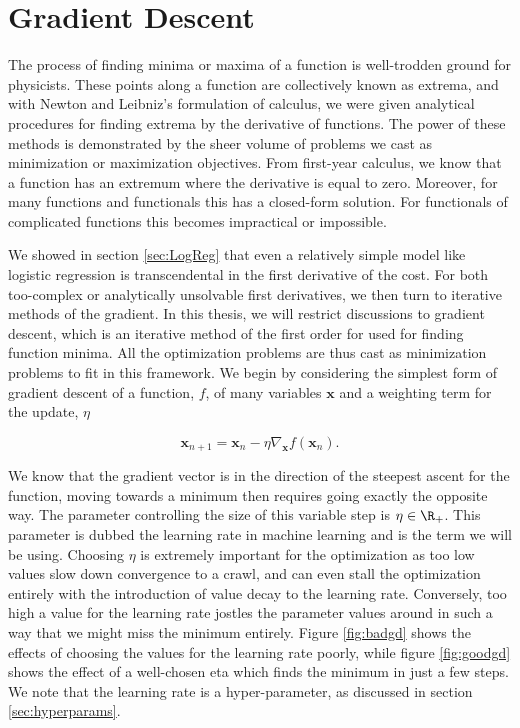 \section{Gradient Descent}\label{sec:gd}

The process of finding minima or maxima of a function is well-trodden ground for physicists. These points along a function are collectively known as extrema, and with Newton and Leibniz's formulation of calculus, we were given analytical procedures for finding extrema by the derivative of functions. The power of these methods is demonstrated by the sheer volume of problems we cast as minimization or maximization objectives. From first-year calculus, we know that a function has an extremum where the derivative is equal to zero. Moreover, for many functions and functionals this has a closed-form solution. For functionals of complicated functions this becomes impractical or impossible. 

We showed in section \ref{sec:LogReg} that even a relatively simple model like logistic regression is transcendental in the first derivative of the cost. For both too-complex or analytically unsolvable first derivatives, we then turn to iterative methods of the gradient. In this thesis, we will restrict discussions to gradient descent, which is an iterative method of the first order for used for finding function minima. All the optimization problems are thus cast as minimization problems to fit in this framework. We begin by considering the simplest form of gradient descent of a function, $f$, of many variables $\mathbf{x}$ and a weighting term for the update, $\eta$

\begin{equation}\label{eq:gd}
\mathbf{x}_{n+1} = \mathbf{x}_{n} - \eta \nabla_\mathbf{x} f(\mathbf{x}_{n}). 
\end{equation} 

\noindent We know that the gradient vector is in the direction of the steepest ascent for the function, moving towards a minimum then requires going exactly the opposite way. The parameter controlling the size of this variable step is  $\eta \in \R_+$. This parameter is dubbed the learning rate in machine learning and is the term we will be using. Choosing $\eta$ is extremely important for the optimization as too low values slow down convergence to a crawl, and can even stall the optimization entirely with the introduction of value decay to the learning rate. Conversely, too high a value for the learning rate jostles the parameter values around in such a way that we might miss the minimum entirely. Figure \ref{fig:badgd} shows the effects of choosing the values for the learning rate poorly, while figure \ref{fig:goodgd} shows the effect of a well-chosen eta which finds the minimum in just a few steps. We note that the learning rate is a hyper-parameter, as discussed in section \ref{sec:hyperparams}. 


